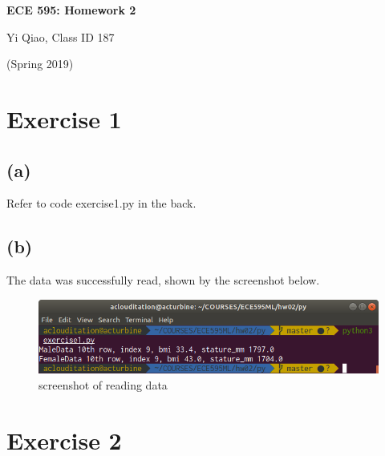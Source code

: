 \documentclass[11pt]{article}
\begin{document}
\begin{center}
\Large{\textbf{ECE 595: Homework 2}}

Yi Qiao, Class ID 187

(Spring 2019)
\end{center}

\section*{Exercise 1}
\subsection*{(a)}
Refer to code exercise1.py in the back. 
\subsection*{(b)}
The data was successfully read, shown by the screenshot below.
\begin{figure}[h]
	\centering
	\includegraphics[width=0.7\linewidth]{exercise1.png}
	\caption{screenshot of reading data}
\end{figure}

\pagebreak
\section*{Exercise 2}
\end{document}
